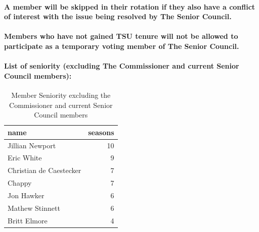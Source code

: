 \documentclass[
]{book}
\begin{document}
\hypertarget{a-member-will-be-skipped-in-their-rotation-if-they-also-have-a-conflict-of-interest-with-the-issue-being-resolved-by-the-senior-council.}{%
\paragraph{A member will be skipped in their rotation if they also have a conflict of interest with the issue being resolved by The Senior Council.}\label{a-member-will-be-skipped-in-their-rotation-if-they-also-have-a-conflict-of-interest-with-the-issue-being-resolved-by-the-senior-council.}}

\hypertarget{members-who-have-not-gained-tsu-tenure-will-not-be-allowed-to-participate-as-a-temporary-voting-member-of-the-senior-council.}{%
\paragraph{Members who have not gained TSU tenure will not be allowed to participate as a temporary voting member of The Senior Council.}\label{members-who-have-not-gained-tsu-tenure-will-not-be-allowed-to-participate-as-a-temporary-voting-member-of-the-senior-council.}}

\hypertarget{list-of-seniority-excluding-the-commissioner-and-current-senior-council-members}{%
\paragraph{List of seniority (excluding The Commissioner and current Senior Council members):}\label{list-of-seniority-excluding-the-commissioner-and-current-senior-council-members}}

\begin{table}

\caption{\label{tab:unnamed-chunk-4}Member Seniority excluding the Commissioner and current Senior Council members}
\centering
\begin{tabular}[t]{lr}
\toprule
name & seasons\\
\midrule
Jillian Newport & 10\\
Eric White & 9\\
Christian de Caestecker & 7\\
Chappy & 7\\
Jon Hawker & 6\\
\addlinespace
Mathew Stinnett & 6\\
Britt Elmore & 4\\
\bottomrule
\end{tabular}
\end{table}
\end{document}
